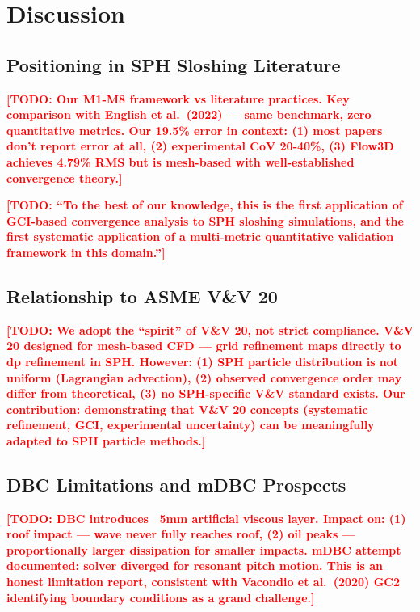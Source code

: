 \documentclass[twocolumn]{svjour3}
\newcommand{\TODO}[1]{\textcolor{red}{\textbf{[TODO: #1]}}}
\begin{document}
\section{Discussion}
\label{sec:discussion}

\subsection{Positioning in SPH Sloshing Literature}
\label{sec:positioning}

\TODO{Our M1-M8 framework vs literature practices. Key comparison with
English et al.\ (2022) --- same benchmark, zero quantitative metrics.
Our 19.5\% error in context: (1) most papers don't report error at all,
(2) experimental CoV 20-40\%, (3) Flow3D achieves 4.79\% RMS but is
mesh-based with well-established convergence theory.}

\TODO{``To the best of our knowledge, this is the first application of
GCI-based convergence analysis to SPH sloshing simulations, and the first
systematic application of a multi-metric quantitative validation framework
in this domain.''}

\subsection{Relationship to ASME V\&V 20}
\label{sec:vv20-relation}

\TODO{We adopt the ``spirit'' of V\&V 20, not strict compliance. V\&V 20
designed for mesh-based CFD --- grid refinement maps directly to dp refinement
in SPH. However: (1) SPH particle distribution is not uniform (Lagrangian
advection), (2) observed convergence order may differ from theoretical,
(3) no SPH-specific V\&V standard exists. Our contribution: demonstrating
that V\&V 20 concepts (systematic refinement, GCI, experimental uncertainty)
can be meaningfully adapted to SPH particle methods.}

\subsection{DBC Limitations and mDBC Prospects}
\label{sec:dbc-limits}

\TODO{DBC introduces ~5mm artificial viscous layer. Impact on: (1) roof
impact --- wave never fully reaches roof, (2) oil peaks --- proportionally
larger dissipation for smaller impacts. mDBC attempt documented: solver
diverged for resonant pitch motion. This is an honest limitation report,
consistent with Vacondio et al.\ (2020) GC2 identifying boundary conditions
as a grand challenge.}
\end{document}
